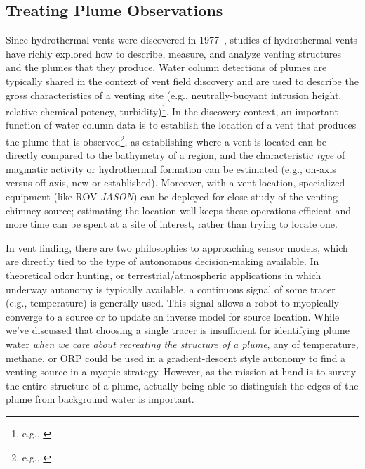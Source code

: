 \subsection{Treating Plume Observations}
Since hydrothermal vents were discovered in 1977~\autocite{corliss1979submarine}, studies of hydrothermal vents have richly explored how to describe, measure, and analyze venting structures and the plumes that they produce. Water column detections of plumes are typically shared in the context of vent field discovery and are used to describe the gross characteristics of a venting site (e.g., neutrally-buoyant intrusion height, relative chemical potency, turbidity)\footnote{e.g., \autocite{kim2020discovery,caratori2012crustal,baker2019posteruption}}. In the discovery context, an important function of water column data is to establish the location of a vent that produces the plume that is observed\footnote{e.g., \autocite{jakuba2007stochastic,branch2020demonstration, jakuba2008autonomous}}, as establishing where a vent is located can be directly compared to the bathymetry of a region, and the characteristic \emph{type} of magmatic activity or hydrothermal formation can be estimated (e.g., on-axis versus off-axis, new or established). Moreover, with a vent location, specialized equipment (like ROV \emph{JASON}) can be deployed for close study of the venting chimney source; estimating the location well keeps these operations efficient and more time can be spent at a site of interest, rather than trying to locate one.

In vent finding, there are two philosophies to approaching sensor models, which are directly tied to the type of autonomous decision-making available. In theoretical odor hunting, or terrestrial/atmospheric applications in which underway autonomy is typically available, a continuous signal of some tracer (e.g., temperature) is generally used. This signal allows a robot to myopically converge to a source\autocite{morse1998robust, edwards2005moth, reddy2022olfactory, wang20203, mason2020evaluation} or to update an inverse model for source location\autocite{vergassola2007infotaxis,salam2019adaptive}. While we've discussed that choosing a single tracer is insufficient for identifying plume water \emph{when we care about recreating the structure of a plume}, any of temperature, methane, or ORP could be used in a gradient-descent style autonomy to find a venting source in a myopic strategy. However, as the mission at hand is to survey the entire structure of a plume, actually being able to distinguish the edges of the plume from background water is important.

